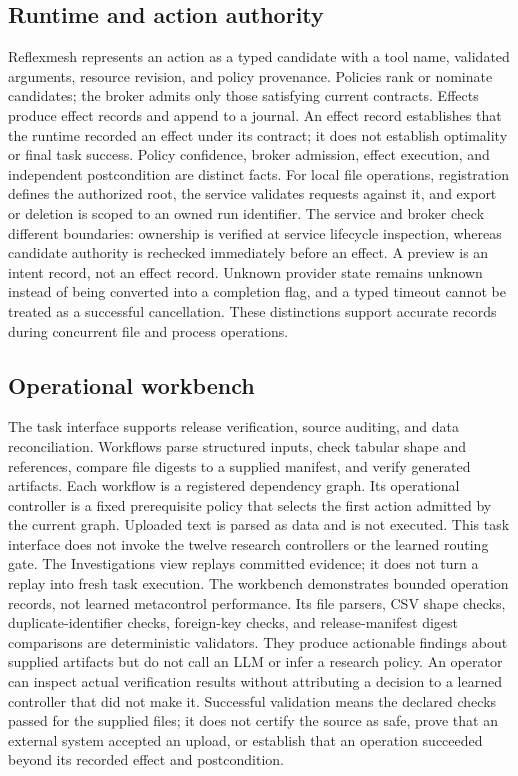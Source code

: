 \subsection{Runtime and action authority}
Reflexmesh represents an action as a typed candidate with a tool name, validated arguments, resource revision, and policy provenance. Policies rank or nominate candidates; the broker admits only those satisfying current contracts. Effects produce effect records and append to a journal. An effect record establishes that the runtime recorded an effect under its contract; it does not establish optimality or final task success. Policy confidence, broker admission, effect execution, and independent postcondition are distinct facts. For local file operations, registration defines the authorized root, the service validates requests against it, and export or deletion is scoped to an owned run identifier. The service and broker check different boundaries: ownership is verified at service lifecycle inspection, whereas candidate authority is rechecked immediately before an effect. A preview is an intent record, not an effect record. Unknown provider state remains unknown instead of being converted into a completion flag, and a typed timeout cannot be treated as a successful cancellation. These distinctions support accurate records during concurrent file and process operations.

\subsection{Operational workbench}
The task interface supports release verification, source auditing, and data reconciliation. Workflows parse structured inputs, check tabular shape and references, compare file digests to a supplied manifest, and verify generated artifacts. Each workflow is a registered dependency graph. Its operational controller is a fixed prerequisite policy that selects the first action admitted by the current graph. Uploaded text is parsed as data and is not executed. This task interface does not invoke the twelve research controllers or the learned routing gate. The Investigations view replays committed evidence; it does not turn a replay into fresh task execution. The workbench demonstrates bounded operation records, not learned metacontrol performance. Its file parsers, CSV shape checks, duplicate-identifier checks, foreign-key checks, and release-manifest digest comparisons are deterministic validators. They produce actionable findings about supplied artifacts but do not call an LLM or infer a research policy. An operator can inspect actual verification results without attributing a decision to a learned controller that did not make it. Successful validation means the declared checks passed for the supplied files; it does not certify the source as safe, prove that an external system accepted an upload, or establish that an operation succeeded beyond its recorded effect and postcondition.

